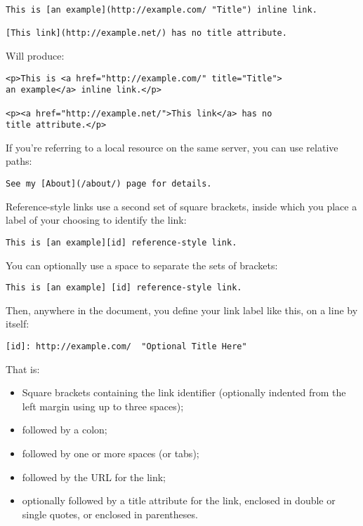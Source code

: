 \begin{verbatim}
This is [an example](http://example.com/ "Title") inline link.

[This link](http://example.net/) has no title attribute.
\end{verbatim}

Will produce:

\begin{verbatim}
<p>This is <a href="http://example.com/" title="Title">
an example</a> inline link.</p>

<p><a href="http://example.net/">This link</a> has no
title attribute.</p>
\end{verbatim}

If you're referring to a local resource on the same server, you can
use relative paths:

\begin{verbatim}
See my [About](/about/) page for details.   
\end{verbatim}

Reference-style links use a second set of square brackets, inside
which you place a label of your choosing to identify the link:

\begin{verbatim}
This is [an example][id] reference-style link.
\end{verbatim}

You can optionally use a space to separate the sets of brackets:

\begin{verbatim}
This is [an example] [id] reference-style link.
\end{verbatim}

Then, anywhere in the document, you define your link label like this,
on a line by itself:

\begin{verbatim}
[id]: http://example.com/  "Optional Title Here"
\end{verbatim}

That is:

\begin{itemize}
\item Square brackets containing the link identifier (optionally
indented from the left margin using up to three spaces);

\item followed by a colon;

\item followed by one or more spaces (or tabs);

\item followed by the URL for the link;

\item optionally followed by a title attribute for the link, enclosed
in double or single quotes, or enclosed in parentheses.

\end{itemize}

